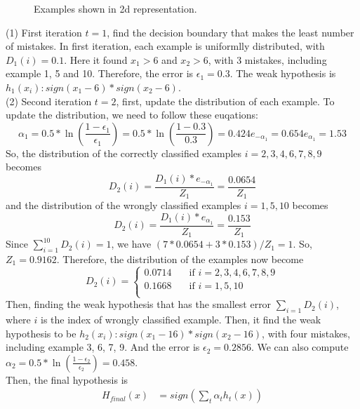\documentclass[11pt]{article}
\begin{document}
\begin{itemize}
\begin{figure}[!ht]
  \caption{Examples shown in 2d representation.}
  \label{fig:hw3_q4}
\end{figure}
(1) First iteration \(t=1\), find the decision boundary that makes the least number of mistakes. In first iteration, each example is uniformlly distributed, with \(D_1(i)=0.1\). Here it found \(x_1>6\) and \( x_2>6\), with 3 mistakes, including example 1, 5 and 10. Therefore, the error is \(\epsilon_1=0.3\). The weak hypothesis is \(h_1(x_i): sign(x_1-6)*sign(x_2-6)\).\\
(2) Second iteration \(t=2\), first, update the distribution of each example. To update the distribution, we need to follow these euqations:
\begin{equation*}
\alpha_1 = 0.5 * \ln (\frac{1-\epsilon_1}{\epsilon_1}) = 0.5 * \ln (\frac{1-0.3}{0.3}) = 0.424
e_{-\alpha_1} = 0.654 
e_{\alpha_1} = 1.53
\end{equation*}
So, the distribution of the correctly classified examples \(i=2,3,4,6,7,8,9\) becomes
\begin{equation*}
D_2(i) = \frac{D_1(i) *e_{-\alpha_1} }{Z_1} = \frac{0.0654}{Z_1}
\end{equation*}
and the distribution of the wrongly classified examples \(i=1,5,10\) becomes
\begin{equation*}
D_2(i) = \frac{D_1(i) *e_{\alpha_1} }{Z_1} = \frac{0.153}{Z_1}
\end{equation*}
Since \(\sum_{i=1}^{10} D_2(i) = 1\), we have \((7*0.0654+3*0.153)/Z_1=1\). So, \(Z_1 = 0.9162\). Therefore, the distribution of the examples now become
\begin{equation*}
D_2(i) =
  \begin{cases}
    0.0714       & \quad \text{if } i=2,3,4,6,7,8,9\\
    0.1668           & \quad \text{if } i=1,5,10\\
  \end{cases}
\end{equation*}
Then, finding the weak hypothesis that has the smallest error \(\sum_{i=1} D_2(i)\), where \(i\) is the index of wrongly classified example. Then, it find the weak hypothesis to be \(h_2(x_i): sign(x_1-16)*sign(x_2-16)\), with four mistakes, including example 3, 6, 7, 9. And the error is \(\epsilon_2 = 0.2856\). We can also compute \(\alpha_2 = 0.5 * \ln (\frac{1-\epsilon_2}{\epsilon_2}) = 0.458 \). \\
Then, the final hypothesis is 
\begin{align*}
H_{final}(x) &= sign(\sum_{t} \alpha_t h_t(x)) \\

\end{align*}
\end{itemize}
\end{document}
